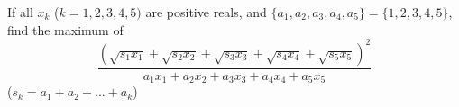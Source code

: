 If all $x_k$ ($k = 1, 2, 3, 4, 5)$ are positive reals, and $\{a_1,a_2, a_3, a_4, a_5\} =  \{1, 2,3 , 4, 5\}$,  find the maximum of
$$\frac{(\sqrt{s_1x_1} +\sqrt{s_2x_2}+\sqrt{s_3x_3}+\sqrt{s_4x_4}+\sqrt{s_5x_5})^2}{a_1x_1 + a_2x_2 + a_3x_3 + a_4x_4 + a_5x_5}$$($s_k = a_1 + a_2 +... + a_k$)